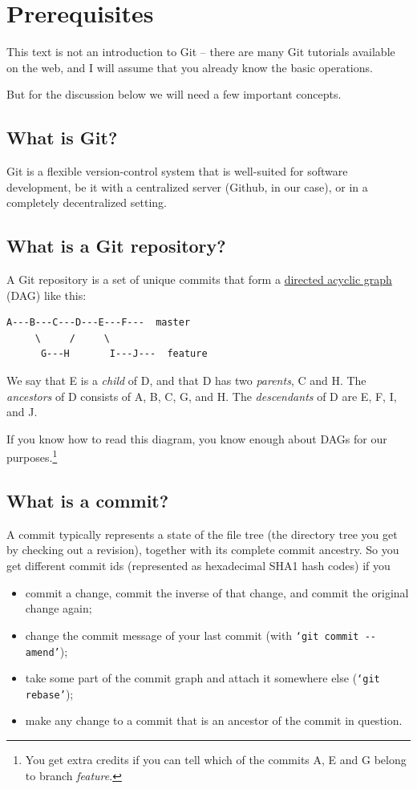 \documentclass[12pt,pdftex]{article}
\begin{document}
\section{Prerequisites}
\label{sec-2}

This text is not an introduction to Git – there are many Git tutorials
available on the web, and I will assume that you already know the basic
operations.

But for the discussion below we will need a few important concepts.

\subsection{What is Git?}
\label{sec-2-1}

Git is a flexible version-control system that is well-suited for
software development, be it with a centralized server (Github, in our
case), or in a completely decentralized setting.


\subsection{What is a Git repository?}
\label{sec-2-2}

A Git repository is a set of unique commits that form a
\href{https://en.wikipedia.org/wiki/Directed_acyclic_graph}{directed acyclic graph} (DAG) like this:
\begin{verbatim}
A---B---C---D---E---F---  master
     \     /     \
      G---H       I---J---  feature
\end{verbatim}

We say that E is a \emph{child} of D, and that D has two
\emph{parents}, C and H.
The \emph{ancestors} of D consists of A, B, C, G, and H.
The \emph{descendants} of D are E, F, I, and J.

If you know how to read this diagram, you know enough about DAGs for
our purposes.\footnote{You get extra credits if you can tell which of the commits A, E and
G belong to branch \emph{feature}.}


\subsection{What is a commit?}
\label{sec-2-3}

A commit typically represents a state of the file tree (the directory
tree you get by checking out a revision), together with its complete
commit ancestry.
So you get different commit ids (represented as hexadecimal SHA1 hash
codes) if you
\begin{itemize}
\item commit a change, commit the inverse of that change, and commit the
original change again;
\item change the commit message of your last commit (with \texttt{‘git commit
     -{}-amend’});
\item take some part of the commit graph and attach it somewhere else
(\texttt{‘git rebase’});
\item make any change to a commit that is an ancestor of the commit in
question.
\end{itemize}
\end{document}
